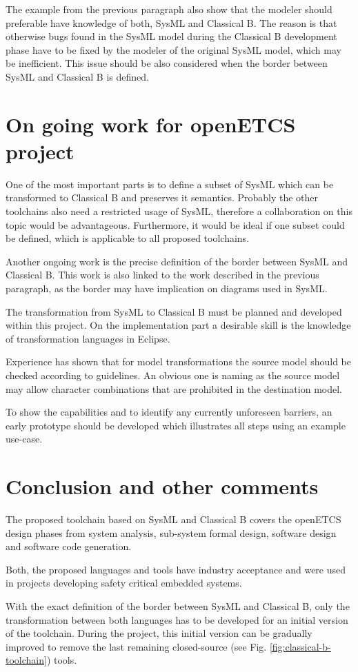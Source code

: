 The example from the previous paragraph also show that the modeler
should preferable have knowledge of both, SysML and Classical B. The
reason is that otherwise bugs found in the SysML model during the
Classical B development phase have to be fixed by the modeler of the
original SysML model, which may be inefficient. This issue should be
also considered when the border between SysML and Classical B is
defined.

\section{On going work for openETCS project}

One of the most important parts is to define a subset of SysML which
can be transformed to Classical B and preserves it semantics. Probably
the other toolchains also need a restricted usage of SysML, therefore
a collaboration on this topic would be advantageous. Furthermore, it
would be ideal if one subset could be defined, which is applicable to
all proposed toolchains.

Another ongoing work is the precise definition of the border between
SysML and Classical B. This work is also linked to the work described
in the previous paragraph, as the border may have implication on
diagrams used in SysML.

The transformation from SysML to Classical B must be planned and
developed within this project. On the implementation part a desirable
skill is the knowledge of transformation languages in Eclipse.

Experience has shown that for model transformations the source model
should be checked according to guidelines. An obvious one is naming as
the source model may allow character combinations that are prohibited
in the destination model.

To show the capabilities and to identify any currently unforeseen
barriers, an early prototype should be developed which illustrates all
steps using an example use-case.

\section{Conclusion and other comments}

The proposed toolchain based on SysML and Classical B covers the
openETCS design phases from system analysis, sub-system formal design,
software design and software code generation.

Both, the proposed languages and tools have industry acceptance and
were used in projects developing safety critical embedded systems. 

With the exact definition of the border between SysML and Classical B,
only the transformation between both languages has to be developed for
an initial version of the toolchain. During the project, this initial
version can be gradually improved to remove the last remaining
closed-source (see Fig. \ref{fig:classical-b-toolchain}) tools.
